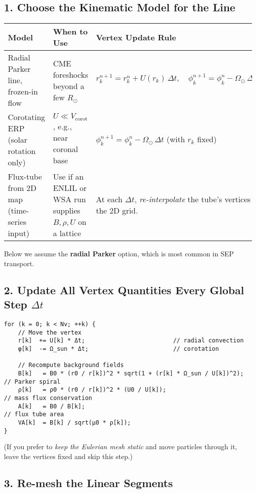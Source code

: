 \subsection*{1. Choose the Kinematic Model for the Line}

\begin{tabular}{|l|l|p{7cm}|}
\hline
\textbf{Model} & \textbf{When to Use} & \textbf{Vertex Update Rule} \\
\hline
Radial Parker line, frozen-in flow & CME foreshocks beyond a few $R_\odot$ &
$ r_k^{n+1}=r_k^n+U(r_k)\,\Delta t,\quad \phi_k^{n+1}=\phi_k^n-\Omega_\odot\,\Delta t\;\frac{r_0}{r_k^{n+1}} $ \\
\hline
Corotating ERP (solar rotation only) & $U\ll V_{\text{corot}}$, e.g., near coronal base &
$ \phi_k^{n+1}=\phi_k^n-\Omega_\odot\,\Delta t $ (with $r_k$ fixed) \\
\hline
Flux-tube from 2D map (time-series input) & Use if an ENLIL or WSA run supplies $B, \rho, U$ on a lattice &
At each $\Delta t$, \emph{re-interpolate} the tube’s vertices from the 2D grid. \\
\hline
\end{tabular}

\vspace{1em}
Below we assume the \textbf{radial Parker} option, which is most common in SEP transport.

\subsection*{2. Update All Vertex Quantities Every Global Step $\Delta t$}

\begin{verbatim}
for (k = 0; k < Nv; ++k) {
    // Move the vertex
    r[k]  += U[k] * Δt;                         // radial convection
    φ[k]  -= Ω_sun * Δt;                        // corotation

    // Recompute background fields
    B[k]   = B0 * (r0 / r[k])^2 * sqrt(1 + (r[k] * Ω_sun / U[k])^2);  // Parker spiral
    ρ[k]   = ρ0 * (r0 / r[k])^2 * (U0 / U[k]);                        // mass flux conservation
    A[k]   = B0 / B[k];                                              // flux tube area
    VA[k]  = B[k] / sqrt(μ0 * ρ[k]);
}
\end{verbatim}

(If you prefer to \emph{keep the Eulerian mesh static} and move particles through it, leave the vertices fixed and skip this step.)

\subsection*{3. Re-mesh the Linear Segments}

